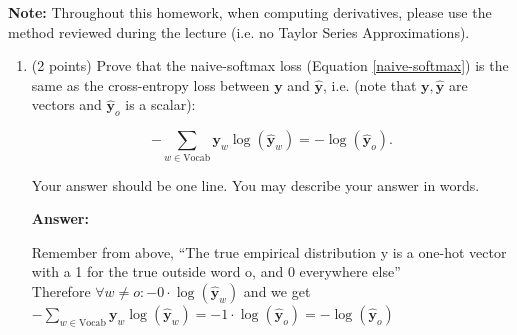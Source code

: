 \documentclass{article}
\newenvironment{answer}{
    {\bf Answer:} \sf \begingroup\color{red}
}{\endgroup}%
\begin{document}
\textbf{Note:} Throughout this homework, when computing derivatives, please use the method reviewed during the lecture (i.e. no Taylor Series Approximations).

\clearpage 
\begin{enumerate}[label=(\alph*)]
\item (2 points) 
Prove that the naive-softmax loss (Equation \ref{naive-softmax}) is the same as the cross-entropy loss between $\bm y$ and $\hat{\bm y}$, i.e. (note that $\bm y, \hat{\bm y}$ are vectors and $\hat{\bm y}_o$ is a scalar):

\begin{equation} 
-\sum_{w \in \text{Vocab}} \bm y_w \log(\hat{\bm y}_w) = - \log (\hat{\bm y}_o).
\end{equation}

Your answer should be one line. You may describe your answer in words.
\begin{shaded}
\begin{answer}
Remember from above, “The true empirical distribution y is a one-hot vector with a 1 for the true outside word o, and 0 everywhere else” \\
Therefore $\forall w \neq o : - 0 \cdot \log (\hat{\bm y}_w)$ and we get $ -\sum_{w \in \text{Vocab}} \bm y_w \log(\hat{\bm y}_w) = - 1 \cdot \log (\hat{\bm y}_o) = - \log (\hat{\bm y}_o) $
\end{answer}
\end{shaded}


\end{enumerate}
\end{document}
